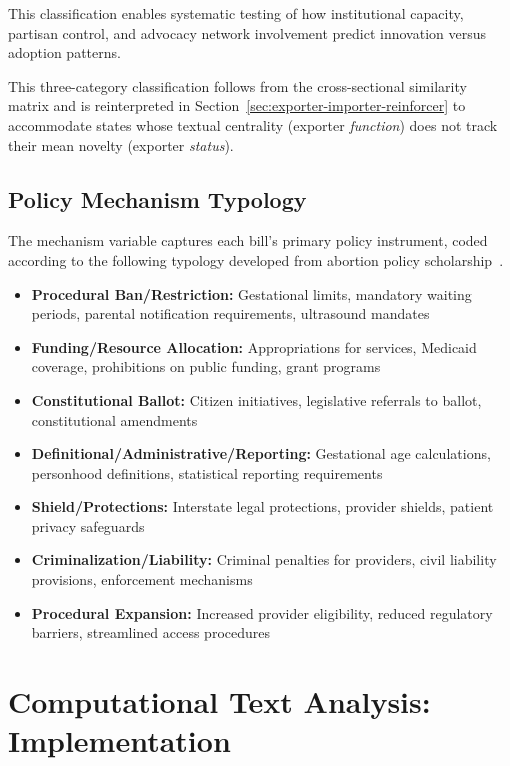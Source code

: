 This classification enables systematic testing of how institutional capacity, partisan control, and advocacy network involvement predict innovation versus adoption patterns.

This three-category classification follows from the cross-sectional similarity matrix and is reinterpreted in Section~\ref{sec:exporter-importer-reinforcer} to accommodate states whose textual centrality (exporter \textit{function}) does not track their mean novelty (exporter \textit{status}).

\subsection{Policy Mechanism Typology}
\label{policymechanism}
The mechanism variable captures each bill's primary policy instrument, coded according to the following typology developed from abortion policy scholarship~\parencite{mooneyLegislativeMoralityAmerican1995,goodwinAbortionLawAmerica2021}.

\begin{itemize}
    \item[\textbf{A.}] \textbf{Procedural Ban/Restriction:} Gestational limits, mandatory waiting periods, parental notification requirements, ultrasound mandates
    \item[\textbf{B.}] \textbf{Funding/Resource Allocation:} Appropriations for services, Medicaid coverage, prohibitions on public funding, grant programs
    \item[\textbf{C.}] \textbf{Constitutional Ballot:} Citizen initiatives, legislative referrals to ballot, constitutional amendments
    \item[\textbf{D.}] \textbf{Definitional/Administrative/Reporting:} Gestational age calculations, personhood definitions, statistical reporting requirements
    \item[\textbf{E.}] \textbf{Shield/Protections:} Interstate legal protections, provider shields, patient privacy safeguards
    \item[\textbf{F.}] \textbf{Criminalization/Liability:} Criminal penalties for providers, civil liability provisions, enforcement mechanisms
    \item[\textbf{G.}] \textbf{Procedural Expansion:} Increased provider eligibility, reduced regulatory barriers, streamlined access procedures
\end{itemize}

\section{Computational Text Analysis: Implementation}
\label{sec:computation}

